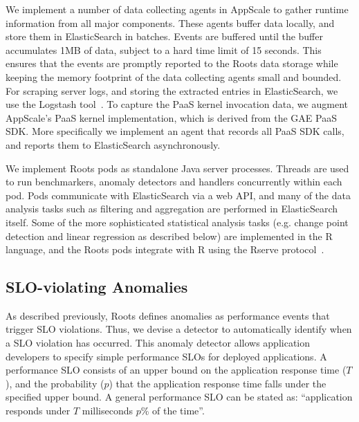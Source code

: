 We implement a number of data collecting agents in AppScale to gather runtime information
from all major components. These agents buffer data locally, and store them in ElasticSearch
in batches. Events are buffered until the buffer accumulates 1MB of data, subject to a hard time limit of 
15 seconds. This ensures that the events are promptly reported to the Roots data
storage while keeping the memory footprint of the data collecting agents small and bounded. 
For scraping server logs, and storing the extracted entries in ElasticSearch,
we use the Logstash tool~\cite{logstash}. 
To capture the PaaS kernel invocation data, we augment AppScale's PaaS kernel implementation,
which is derived from the GAE PaaS SDK. More specifically we implement an agent that records
all PaaS SDK calls, and reports them to ElasticSearch asynchronously. 

We implement Roots pods as standalone Java server processes. Threads are used to run benchmarkers,
anomaly detectors and handlers concurrently within each pod. Pods communicate with ElasticSearch via
a web API, and many of the data analysis tasks such as filtering and aggregation are performed
in ElasticSearch itself. 
Some of the more sophisticated statistical analysis tasks (e.g. change point detection and 
linear regression as described below) are implemented in the R
language, and the Roots pods integrate with R using the Rserve protocol~\cite{Urbanek03rserve--}.

\subsection{SLO-violating Anomalies}

As described previously,
Roots defines anomalies as performance events that trigger SLO
violations. Thus, we devise a detector to automatically identify when a SLO
violation has occurred. This anomaly detector
allows application developers to specify simple performance SLOs for deployed applications. A
performance SLO consists of an upper bound on the application response time ($T$), and the probability ($p$)
that the application response time falls under the specified upper bound. 
A general performance 
SLO can be stated as: ``application responds under $T$ milliseconds $p$\% of the time''.


